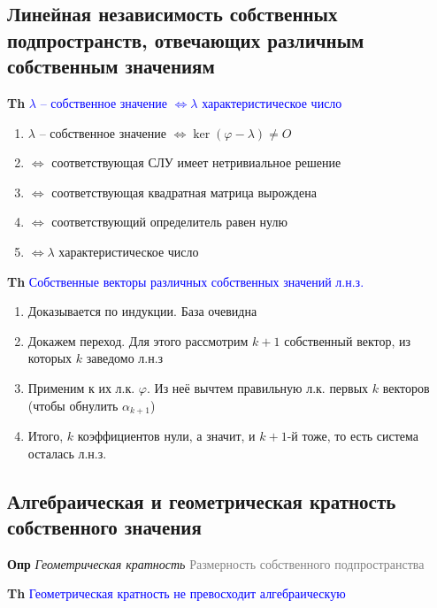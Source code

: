     \subsection{Линейная независимость собственных подпространств, отвечающих различным собственным значениям}

    \textbf{Th} \textcolor{blue}{$\lambda$ -- собственное значение $\Leftrightarrow \lambda$ характеристическое число}

    \begin{enumerate}
        \item $\lambda$ -- собственное значение $\Leftrightarrow \ker (\varphi - \lambda) \neq O$
        \item $\Leftrightarrow$ соответствующая СЛУ имеет нетривиальное решение
        \item $\Leftrightarrow$ соответствующая квадратная матрица вырождена
        \item $\Leftrightarrow$ соответствующий определитель равен нулю
        \item $\Leftrightarrow \lambda$ характеристическое число
    \end{enumerate}

    \textbf{Th} \textcolor{blue}{Собственные векторы различных собственных значений л.н.з.}

    \begin{enumerate}
        \item Доказывается по индукции.
        База очевидна
        \item Докажем переход.
        Для этого рассмотрим $k+1$ собственный вектор, из которых $k$ заведомо л.н.з
        \item Применим к их л.к. $\varphi$.
        Из неё вычтем правильную л.к. первых $k$ векторов (чтобы обнулить $\alpha_{k+1}$)
        \item Итого, $k$ коэффициентов нули, а значит, и $k+1$-й тоже, то есть система осталась л.н.з.
    \end{enumerate}

    \subsection{Алгебраическая и геометрическая кратность собственного значения}

    \textbf{Опр} \textit{Геометрическая кратность} \textcolor{gray}{Размерность собственного подпространства}

    \textbf{Th} \textcolor{blue}{Геометрическая кратность не превосходит алгебраическую}

